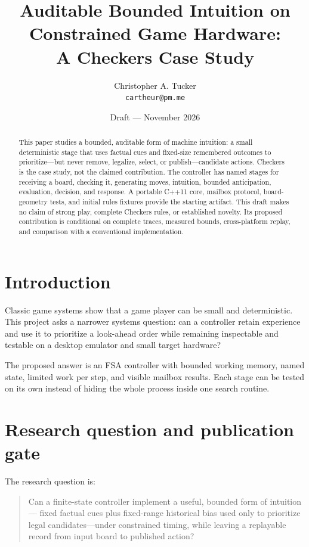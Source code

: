 \documentclass[11pt]{article}
\title{Auditable Bounded Intuition on Constrained Game Hardware:\\
A Checkers Case Study}
\author{Christopher A. Tucker\\
\texttt{cartheur@pm.me}}
\date{Draft --- November 2026}
\begin{document}
\maketitle

\begin{abstract}
This paper studies a bounded, auditable form of machine intuition: a small
deterministic stage that uses factual cues and fixed-size remembered outcomes
to prioritize---but never remove, legalize, select, or publish---candidate
actions. Checkers is the case study, not the claimed contribution. The
controller has named stages for receiving a board, checking it, generating
moves, intuition, bounded anticipation, evaluation, decision, and response.
A portable C++11 core, mailbox protocol, board-geometry tests, and initial
rules fixtures provide the starting artifact. This draft makes no claim of
strong play, complete Checkers rules, or established novelty. Its proposed
contribution is conditional on complete traces, measured bounds,
cross-platform replay, and comparison with a conventional implementation.
\end{abstract}

\section{Introduction}

Classic game systems show that a game player can be small and deterministic.
This project asks a narrower systems question: can a controller retain
experience and use it to prioritize a look-ahead order while remaining
inspectable and testable on a desktop emulator and small target hardware?

The proposed answer is an FSA controller with bounded working memory, named
state, limited work per step, and visible mailbox results. Each stage can be
tested on its own instead of hiding the whole process inside one search
routine.

\section{Research question and publication gate}

The research question is:

\begin{quote}
Can a finite-state controller implement a useful, bounded form of intuition---
fixed factual cues plus fixed-range historical bias used only to prioritize
legal candidates---under constrained timing, while leaving a replayable record
from input board to published action?
\end{quote}
\end{document}
